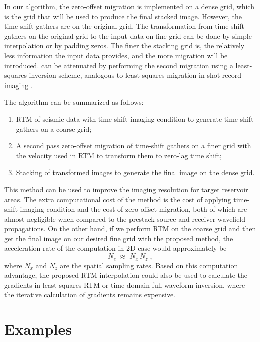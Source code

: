 In our algorithm, the zero-offset migration is implemented on a dense grid, 
which is the grid that will be used to produce the final stacked image.
However, the time-shift gathers are on the original grid.
The transformation from time-shift gathers on the original grid to the input data on fine grid can be done by simple interpolation or by padding zeros.
The finer the stacking grid is, the relatively less information the input data provides, 
and the more migration   will be introduced. 
  can be attenuated by performing the second migration using a least-squares inversion scheme,
analogous to least-squares migration in shot-record imaging \cite[]{nemeth99,kuehl03,xue16}.

The algorithm can be summarized as follows:
\begin{enumerate}
\item RTM of seismic data with time-shift imaging condition to generate time-shift gathers on a coarse grid;
\item A second pass zero-offset migration of time-shift gathers on a finer grid with the velocity used in RTM to transform them to zero-lag time shift; 
\item Stacking of transformed images to generate the final image on the dense grid.
\end{enumerate}

This method can be used to improve the imaging resolution for target reservoir areas.
The extra computational cost of the method is the cost of applying time-shift imaging condition and the cost of zero-offset migration,
both of which are almost negligible when compared to the prestack source and receiver wavefield propagations.
On the other hand, if we perform RTM on the coarse grid and then get the final image on our desired fine grid with the proposed method,
the acceleration rate of the computation in 2D case would approximately be
\begin{equation}
	\label{eq:efficiency}
	N_e \; \approx \; N_x \, N_z \; ,
\end{equation}
where $N_x$ and $N_z$ are the spatial sampling rates.
Based on this computation advantage, the proposed RTM interpolation could also be used to calculate 
the gradients in least-squares RTM or time-domain full-waveform inversion, 
where the iterative calculation of gradients remains expensive.

\section{Examples}
